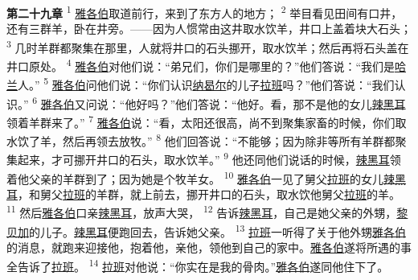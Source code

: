 \textbf{第二十九章\quad}
\textsuperscript{1}
\uline{雅各伯}取道前行，来到了东方人的地方；
\textsuperscript{2}
举目看见田间有口井，还有三群羊，卧在井旁。——因为人惯常由这井取水饮羊，井口上盖着块大石头；
\textsuperscript{3}
几时羊群都聚集在那里，人就将井口的石头挪开，取水饮羊；然后再将石头盖在井口原处。
\textsuperscript{4}
\uline{雅各伯}对他们说：“弟兄们，你们是哪里的？”他们答说：“我们是\uline{哈兰}人。”
\textsuperscript{5}
\uline{雅各伯}问他们说：“你们认识\uline{纳曷尔}的儿子\uline{拉班}吗？”他们答说：“我们认识。”
\textsuperscript{6}
\uline{雅各伯}又问说：“他好吗？”他们答说：“他好。看，那不是他的女儿\uline{辣黑耳}领着羊群来了。”
\textsuperscript{7}
\uline{雅各伯}说：“看，太阳还很高，尚不到聚集家畜的时候，你们取水饮了羊，然后再领去放牧。”
\textsuperscript{8}
他们回答说：“不能够；因为除非等所有羊群都聚集起来，才可挪开井口的石头，取水饮羊。”
\textsuperscript{9}
他还同他们说话的时候，\uline{辣黑耳}领着他父亲的羊群到了；因为她是个牧羊女。
\textsuperscript{10}
\uline{雅各伯}一见了舅父\uline{拉班}的女儿\uline{辣黑耳}，和舅父\uline{拉班}的羊群，就上前去，挪开井口的石头，取水饮他舅父\uline{拉班}的羊。
\textsuperscript{11}
然后\uline{雅各伯}口亲\uline{辣黑耳}，放声大哭，
\textsuperscript{12}
告诉\uline{辣黑耳}，自己是她父亲的外甥，\uline{黎贝加}的儿子。\uline{辣黑耳}便跑回去，告诉她父亲。
\textsuperscript{13}
\uline{拉班}一听得了关于他外甥\uline{雅各伯}的消息，就跑来迎接他，抱着他，亲他，领他到自己的家中。\uline{雅各伯}遂将所遇的事全告诉了\uline{拉班}。
\textsuperscript{14}
\uline{拉班}对他说：“你实在是我的骨肉。”\uline{雅各伯}遂同他住下了。

